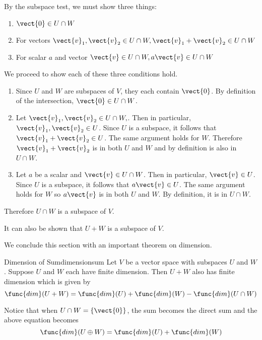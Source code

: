 \begin{solution}
By the subspace test, we must show three things:
\begin{enumerate}
\item $\vect{0} \in U \cap W$
\item For vectors $\vect{v}_1, \vect{v}_2 \in U \cap W, \vect{v}_1+\vect{v}_2 \in U \cap W$
\item For scalar $a$ and vector $\vect{v} \in U \cap W, a\vect{v} \in U \cap W$
\end{enumerate}

We proceed to show each of these three conditions hold.
\begin{enumerate}
\item 
Since $U$ and $W$ are subspaces of $V$, they each contain $\vect{0}$. By definition of the intersection, $\vect{0} \in U \cap W$. 

\item
Let  $\vect{v}_1, \vect{v}_2 \in U \cap W,$. Then in particular,  $\vect{v}_1, \vect{v}_2 \in U$. Since $U$ is a subspace, it follows that $ \vect{v}_1+\vect{v}_2 \in U$. The same argument holds for $W$. Therefore $\vect{v}_1+\vect{v}_2$ is in both $U$ and $W$ and by definition is also in $U \cap W$. 

\item 
Let $a$ be a scalar and $\vect{v} \in U \cap W$. Then in particular, $\vect{v} \in U$. Since $U$ is a subspace, it follows that $a \vect{v} \in U$. The same argument holds for $W$ so $a\vect{v}$ is in both $U$ and $W$. By definition, it is in $U \cap W$. 
\end{enumerate}

Therefore $U \cap W$ is a subspace of $V$. 
\end{solution}

It can also be shown that $U + W$ is a subspace of $V$.

We conclude this section with an important theorem on dimension.

\begin{theorem}{Dimension of Sum}{dimensionsum}
Let $V$ be a vector space with subspaces $U$ and $W$. Suppose $U$ and $W$ each have finite dimension. Then $U + W$ also has finite dimension which is given by\[
\func{dim} (U+W) = \func{dim}(U) + \func{dim}(W) - \func{dim} (U \cap W)
\]
\end{theorem}

Notice that when $U \cap W = \left\{ \vect{0} \right\}$, the sum becomes the direct sum and the above equation becomes 
\[
\func{dim} (U \oplus W) = \func{dim}(U) + \func{dim}(W)
\]